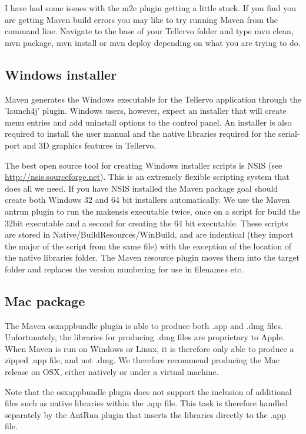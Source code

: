 I have had some issues with the m2e plugin getting a little stuck.  If you find you are getting Maven build errors you may like to try running Maven from the command line.  Navigate to the base of your Tellervo folder and type mvn clean, mvn package, mvn install or mvn deploy depending on what you are trying to do.

\subsection{Windows installer}
\label{txt:windowsInstaller}
Maven generates the Windows executable for the Tellervo application through the 'launch4j' plugin.  Windows users, however, expect an installer that will create menu entries and add uninstall options to the control panel.  An installer is also required to install the user manual and the native libraries required for the serial-port and 3D graphics features in Tellervo.  

The best open source tool for creating Windows installer scripts is NSIS (see \url{http://nsis.sourceforge.net}).  This is an extremely flexible scripting system that does all we need.  If you have NSIS installed the Maven package goal should create both Windows 32 and 64 bit installers automatically.  We use the Maven antrun plugin to run the makensis executable twice, once on a script for build the 32bit executable and a second for creating the 64 bit executable.  These scripts are stored in Native/BuildResources/WinBuild, and are indentical (they import the major of the script from the same file) with the exception of the location of the native libraries folder.  The Maven resource plugin moves them into the target folder and replaces the version numbering for use in filenames etc.

\subsection{Mac package}
The Maven osxappbundle plugin is able to produce both .app and .dmg files.  Unfortunately, the libraries for producing .dmg files are proprietary to Apple.  When Maven is run on Windows or Linux, it is therefore only able to produce a  zipped .app file, and not .dmg.  We therefore recommend producing the Mac release on OSX, either natively or under a virtual machine.

Note that the osxappbundle plugin does not support the inclusion of additional files such as native libraries  within the .app file. This task is therefore handled separately by the AntRun plugin that inserts the libraries directly to the .app file.


